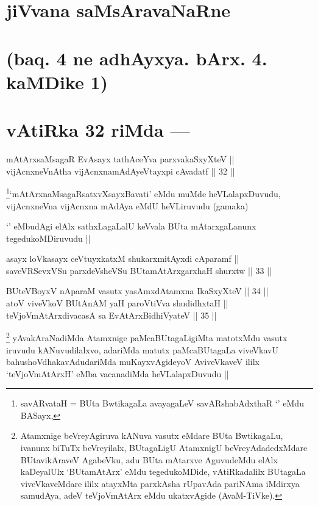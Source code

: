 \section*{jiVvana saMsAravaNaRne}

\section*{(baq. 4 ne adhAyxya. bArx. 4. kaMDike 1)}

\section*{vAtiRka 32 riMda ---}


\begin{shl}
mAtArxsaMsagaR EvAsayx tathAceYva parxvakaSxyXteV || \\
vijAcnxneVnAtha vijAcnxnamAdAyeVtayxpi cAvadatf ||  32 || 
\end{shl}

\begin{artha}
\footnote{savARvataH = BUta BwtikagaLa avayagaLeV savARshabAdxthaR
  `\stext' eMdu BASayx,}`mAtArx\s naMsagaRsatxvXsayxBavati' eMdu muMde
heVLalapxDuvudu, vijAcnxneVna vijAcnxna mAdAya eMdU heVLiruvudu
(gamaka)
\end{artha}

\begin{artha}
`\stext' eMbudAgi elAlx sathxLagaLalU keVvala BUta mAtarxgaLanunx
  tegedukoMDiruvudu ||
\end{artha}

\begin{shl}
asayx loVkasayx ceVtuyxkatxM shukarxmitAyxdi cAparamf || \\
saveVRSevxVSu parxdeVsheVSu BUtamAtArxgarxhaH shurxtw ||  33 ||  
\end{shl}

\begin{shl}
BUteVBoyxV nAparaM vasutx yasAmxdAtamxna IkaSxyXteV ||  34 || \\
atoV viveVkoV BUtAnAM yaH paroV\s tiVva shudidhxtaH || \\
teVjoVmAtArxdivacasA sa EvAtArxBidhiVyateV ||  35 ||  
\end{shl}

\begin{artha}
\footnote{Atamxnige beVreyAgiruva kANuva vasutx eMdare BUta
  BwtikagaLu, ivanunx biTuTx beVreyilalx, BUtagaLigU AtamxnigU
  beVreyAdadedxMdare BUtavikAraveV AgabeVku, adu BUta mAtarxve
  AguvudeMdu elAlx kaDeyalUlx `BUtamAtArx' eMdu tegedukoMDide,
  vAtiRkadalilx BUtagaLa viveVkaveMdare ililx atayxMta parxkAsha
  rUpavAda pariNAma iMdirxya samudAya, adeV teVjoVmAtArx eMdu
  ukatxvAgide (AvaM-TiVke).}
yAvakAraNadiMda Atamxnige paMcaBUtagaLigiMta matotxMdu vasutx iruvudu
kANuvudilalxvo, adariMda matutx paMcaBUtagaLa viveVkavU
bahushoVdhakavAdudariMda muKayxvAgideyoV AviveVkaveV ililx
`teVjoVmAtArxH' eMba vacanadiMda heVLalapxDuvudu ||
\end{artha}

